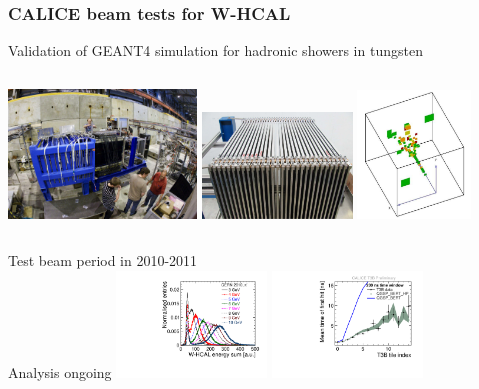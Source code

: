 \documentclass{beamer}
\begin{document}
\begin{frame}
\frametitle{CALICE beam tests for W-HCAL}
\alert{Validation of GEANT4 simulation for hadronic showers in tungsten}\\
\begin{columns}[c]
\column{5cm}
\includegraphics[width=5cm]{whcal_model.png}
\column{4cm}
\includegraphics[width=4cm]{Fig820b.pdf}
\column{3cm}
\includegraphics[width=3cm]{Fig820c.pdf}
\end{columns}
\begin{columns}[c]
\column{5cm}
Test beam period in 2010-2011\\
Analysis ongoing
\column{4cm}
\includegraphics[width=4cm]{Fig821.pdf}
\column{4cm}
\includegraphics[width=4cm]{Fig824.pdf}
\end{columns}
\end{frame}
\end{document}

